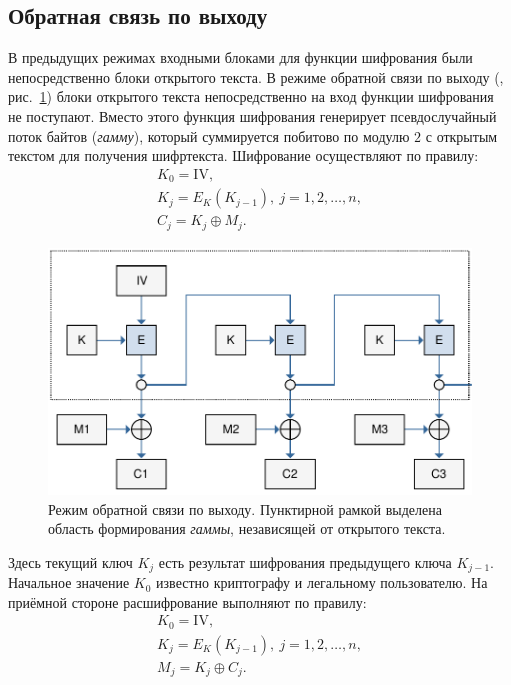 \subsection{Обратная связь по выходу}

В предыдущих режимах входными блоками для функции шифрования были непосредственно блоки открытого текста. В режиме обратной связи по выходу (, рис.~\ref{fig:OFB}) блоки открытого текста непосредственно на вход функции шифрования не поступают. Вместо этого функция шифрования генерирует псевдослучайный поток байтов (\emph{гамму}), который суммируется побитово по модулю $2$ с открытым текстом для получения шифртекста. Шифрование осуществляют по правилу:
\[ \begin{array}{l}
    K_0 = \textrm{IV}, \\
    K_j = E_K(K_{j-1}), ~ j = 1, 2, \dots, n, \\
    C_j = K_j \oplus M_j.
\end{array} \]

\begin{figure}[bt]
	\centering
	\includegraphics[width=1\textwidth]{pic/OFB}
	\caption{Режим обратной связи по выходу. Пунктирной рамкой выделена область формирования \emph{гаммы}, независящей от открытого текста.}
	\label{fig:OFB}
\end{figure}

Здесь текущий ключ $K_j$ есть результат шифрования предыдущего ключа $K_{j-1}$. Начальное значение $K_0$ известно криптографу и легальному пользователю. На приёмной стороне расшифрование выполняют по правилу:
\[ \begin{array}{l}
    K_0 = \textrm{IV}, \\
    K_j = E_K(K_{j-1}), ~ j = 1, 2, \dots, n, \\
    M_j = K_j \oplus C_j.
\end{array} \]

